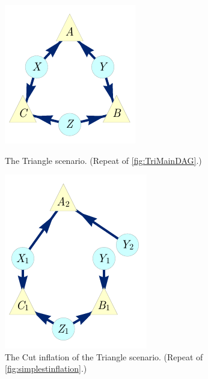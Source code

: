 \begin{figure}[bh]
\centering
\begin{minipage}[t]{0.45\linewidth}
\centering
\includegraphics[scale=1]{TriDagRawALT.pdf}
\caption{The Triangle scenario. (Repeat of \cref{fig:TriMainDAG}.)}\label{fig:TriMainDAGv2}
\end{minipage}
\hfill
\begin{minipage}[t]{0.45\linewidth}
\centering
\includegraphics[scale=1]{nobroadcastingexamplenohighlightALT.pdf}
\caption{The Cut inflation of the Triangle scenario. (Repeat of \cref{fig:simplestinflation}.)}\label{fig:TriDagSubA2B1C1v2}
\end{minipage}
\end{figure}


